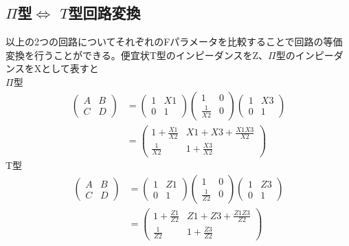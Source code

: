 \subsection{$\Pi$型$\Longleftrightarrow$ $T$型回路変換}
以上の2つの回路についてそれぞれのFパラメータを比較することで回路の等価変換を行うことができる。便宜状T型のインピーダンスをZ、$\Pi$型のインピーダンスをXとして表すと
\\
$\Pi$型\\
\begin{eqnarray}
    \begin{pmatrix}A&B\\C&D\end{pmatrix} &= \begin{pmatrix}1&X1\\0&1\end{pmatrix}\begin{pmatrix}1&0\\\frac{1}{X2}&0\end{pmatrix}\begin{pmatrix}1&X3\\0&1\end{pmatrix}\\
    &=\begin{pmatrix}1+\frac{X1}{X2}&X1+X3+\frac{X1X3}{X2}\\\frac{1}{X2}&1+\frac{X3}{X2}\end{pmatrix}
\end{eqnarray}
T型\\
\begin{eqnarray}
    \begin{pmatrix}A&B\\C&D\end{pmatrix} &= \begin{pmatrix}1&Z1\\0&1\end{pmatrix}\begin{pmatrix}1&0\\\frac{1}{Z2}&0\end{pmatrix}\begin{pmatrix}1&Z3\\0&1\end{pmatrix}\\
    &=\begin{pmatrix}1+\frac{Z1}{Z2}&Z1+Z3+\frac{Z1Z3}{Z2}\\\frac{1}{Z2}&1+\frac{Z3}{Z2}\end{pmatrix}
\end{eqnarray}

